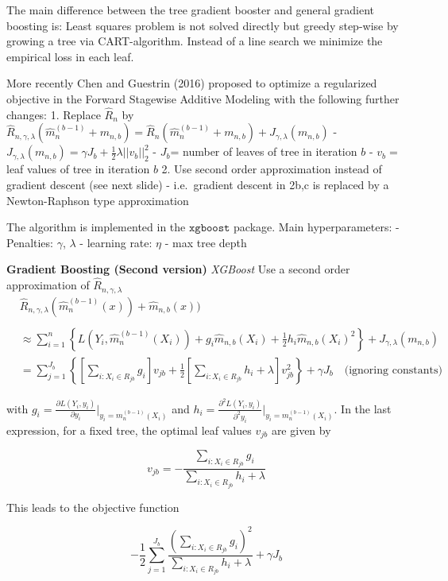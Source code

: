 \documentclass[a4paper,12pt,openany]{book}
\begin{document}
The main difference between the tree gradient booster and general gradient boosting is: Least squares problem is not solved directly but greedy step-wise by growing a tree via CART-algorithm. Instead of a line search we minimize the empirical loss in each leaf.

More recently Chen and Guestrin (2016) proposed to optimize a regularized objective in the Forward Stagewise Additive Modeling with the following further changes:
1. Replace \(\hat R_n\) by \(\hat R_{n,\gamma,\lambda}(\hat m_n^{(b-1)}+m_{n,b}) =\hat R_n(\hat m_n^{(b-1)}+m_{n,b}) + J_{\gamma,\lambda}(m_{n,b})\)
- \(J_{\gamma,\lambda}(m_{n,b})= \gamma J_b+ \frac 1 2 \lambda ||v_b||_2^2\)
- \(J_b\)= number of leaves of tree in iteration \(b\)
- \(v_b=\) leaf values of tree in iteration \(b\)
2. Use second order approximation instead of gradient descent (see next slide)
- i.e.~gradient descent in 2b,c is replaced by a Newton-Raphson type approximation

The algorithm is implemented in the \(\texttt{xgboost}\) package. Main hyperparameters:
- Penalties: \(\gamma\), \(\lambda\)
- learning rate: \(\eta\)
- max tree depth

\textbf{Gradient Boosting (Second version)} \emph{XGBoost} Use a second order approximation of \(\hat R_{n,\gamma,\lambda}\)
\begin{align}
&\hat R_{n,\gamma,\lambda}(\hat m_n^{(b-1)}(x))+\hat m_{n,b}(x))\\
\\&\approx\sum_{i=1}^n \left\{ L(Y_i,\hat 
m_n^{(b-1)}(X_i))+ g_i\hat m_{n,b}(X_i)+ \frac 1 2 h_i \hat m_{n,b}(X_i)^2\right \}+ J_{\gamma,\lambda}(m_{n,b})\\
&= \sum_{j=1}^{J_b}\left \{ \left[\sum_{i: X_i \in R_{jb}}g_i\right]v_{jb} + \frac 1 2 \left[\sum_{i: X_i \in R_{jb}}h_i+\lambda\right]v_{jb}^2 \right\}+\gamma J_b \quad \text{(ignoring constants)}
\end{align}

with \(g_i= \frac{\partial L(Y_i,y_i)}{\partial y_i} \Bigr\rvert_{y_i=m_n^{(b-1)}(X_i)}\) and \(h_i= \frac{\partial^2 L(Y_i,y_i)}{\partial^2 y_i} \Bigr\rvert_{y_i=m_n^{(b-1)}(X_i)}\). In the last expression, for a fixed tree, the optimal leaf values \(v_{jb}\) are given by

\[
v_{jb}=-\frac{\sum_{i: X_i \in R_{jb}} g_i }{\sum_{i: X_i \in R_{jb}} h_i+\lambda}
\]

This leads to the objective function

\[
-\frac 1 2\sum_{j=1}^{J_b} \frac {(\sum_{i: X_i \in R_{jb}}g_i)^2}{\sum_{i: X_i \in R_{jb}}h_i+\lambda}+\gamma J_b
\]
\end{document}
